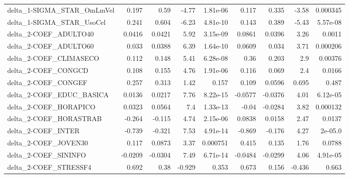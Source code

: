 \begin{tabular}{lrrrrrrrr}
delta\_1-SIGMA\_STAR\_OmLmVel            &       0.197 &         0.59 &   -4.77 & 1.81e-06 &      0.117 &       0.335 &        -3.58 &      0.000345 \\
delta\_1-SIGMA\_STAR\_UsoCel             &       0.241 &        0.604 &   -6.23 & 4.81e-10 &      0.143 &       0.389 &        -5.43 &      5.57e-08 \\
delta\_2-COEF\_ADULTO40                 &      0.0416 &       0.0421 &    5.92 & 3.15e-09 &     0.0861 &      0.0396 &         3.26 &        0.0011 \\
delta\_2-COEF\_ADULTO60                 &       0.033 &       0.0388 &    6.39 & 1.64e-10 &     0.0609 &       0.034 &         3.71 &      0.000206 \\
delta\_2-COEF\_CLIMASECO                &       0.112 &        0.148 &    5.41 & 6.28e-08 &       0.36 &       0.203 &          2.9 &       0.00376 \\
delta\_2-COEF\_CONGCD                   &       0.108 &        0.155 &    4.76 & 1.91e-06 &      0.116 &       0.069 &          2.4 &        0.0166 \\
delta\_2-COEF\_CONGEF                   &       0.257 &        0.313 &    1.42 &    0.157 &      0.109 &      0.0596 &        0.695 &         0.487 \\
delta\_2-COEF\_EDUC\_BASICA              &      0.0136 &       0.0217 &    7.76 & 8.22e-15 &    -0.0577 &     -0.0376 &         4.01 &      6.12e-05 \\
delta\_2-COEF\_HORAPICO                 &      0.0323 &       0.0564 &     7.4 & 1.33e-13 &      -0.04 &     -0.0284 &         3.82 &      0.000132 \\
delta\_2-COEF\_HORASTRAB                &      -0.264 &       -0.115 &    4.74 & 2.15e-06 &     0.0838 &      0.0158 &         2.47 &        0.0137 \\
delta\_2-COEF\_INTER                    &      -0.739 &       -0.321 &    7.53 & 4.91e-14 &     -0.869 &      -0.176 &         4.27 &       2e-05.0 \\
delta\_2-COEF\_JOVEN30                  &       0.117 &       0.0873 &    3.37 & 0.000751 &      0.415 &       0.135 &         1.76 &        0.0788 \\
delta\_2-COEF\_SININFO                  &     -0.0209 &      -0.0304 &    7.49 & 6.71e-14 &    -0.0484 &     -0.0299 &         4.06 &      4.91e-05 \\
delta\_2-COEF\_STRESSF4                 &       0.692 &         0.38 &  -0.929 &    0.353 &      0.673 &       0.156 &       -0.436 &         0.663 \\

\end{tabular}
